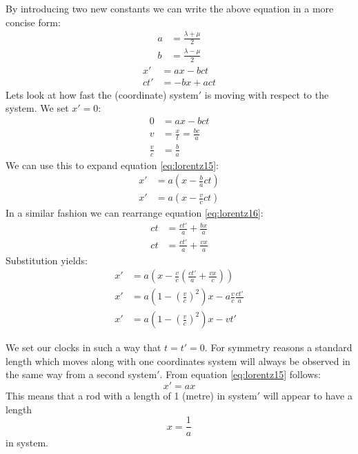 By introducing two new constants we can write the above equation in a more concise form:
\begin{align}\label{eq:lorentz1314}
a &= \frac{\lambda + \mu}{2} \\
b &= \frac{\lambda - \mu}{2}
\end{align}
\begin{align} \label{eq:lorentz15}
x' &= ax - bct \\ 
ct'&= -bx +act \label{eq:lorentz16}
\end{align}
Lets look at how fast the (coordinate) system$'$ is moving with respect to the system. We set $x'=0$:
\begin{align}\label{eq:lorentz171819}
0 &= ax - bct \\
v &= \frac{x}{t} = \frac{bc}{a} \\ 
\frac{v}{c} &= \frac{b}{a}\label{eq:lorentz19}
\end{align}
We can use this to expand equation \ref{eq:lorentz15}:
\begin{align}\label{eq:lorentz2021}
x' &= a\left( x -\frac{b}{a}ct\right)   \\
x' &= a\left( x -\frac{v}{c}ct\right) 
\end{align}
In a similar fashion we can rearrange equation \ref{eq:lorentz16}:
\begin{align}\label{eq:lorentz2223}
ct &= \frac{ct'}{a}+\frac{bx}{a}  \\
ct &= \frac{ct'}{a}+\frac{vx}{a}
\end{align}
Substitution yields:
\begin{align}\label{eq:lorentz24}
x' &= a\left( x-\frac{v}{c}\left( \frac{ct'}{a}+\frac{vx}{c}\right) \right) \\
x' &= a\left( 1-\left( \frac{v}{c}\right) ^2\right) x-a \frac{v}{c}\frac{ct'}{a}\\
x' &= a\left( 1-\left( \frac{v}{c}\right) ^2\right) x-vt' \label{eq:lorentz26}
\end{align}

We set our clocks in such a way that $t=t'=0$. For symmetry reasons a standard length which moves along with one coordinates system will always be observed in the same way from a second system$'$. From equation \ref{eq:lorentz15} follows:
\begin{equation}\label{eq:lorentz27}
x'=ax
\end{equation}
This means that a rod with a length of 1 (metre) in system$'$ will appear to have a length
\begin{equation}\label{eq:lorentz28}
x=\frac{1}{a}
\end{equation}
in system.

